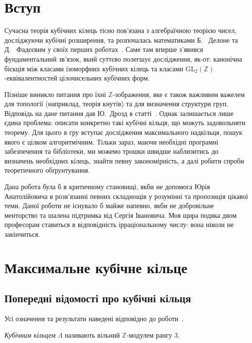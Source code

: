 \documentclass{thesis}
\begin{document}
\newpage

\chapter*{Вступ}\label{Introduction}
Сучасна теорія кубічних кілець тісно пов'язана з алгебраїчною теорією чисел, досліджуючи кубічні розширення, та розпочалась математиками Б.~ Делоне та Д.~ Фадєєвим у своїх перших роботах~\cite{delone1964theory}. Саме там вперше з'явився фундаментальний зв'язок, який суттєво полегшує дослідження, як-от: канонічна бієкція між класами ізоморфних кубічних кілець та класами $\mathrm{GL}_2(\mathbb{Z})$-еквівалентностей цілочисельних кубічних форм.

Пізніше виникло питання про їхні $\mathbb{Z}$-зображення, яке є також важливим важелем для топології (наприклад, теорія кнутів) та для визначення структури груп. Відповідь на дане питання дав Ю.~Дрозд в статті~\cite{drozd1967representations}. Однак залишається лише єдина проблема: описати конкретно такі кубічні кільця, що можуть задовольняти теорему. Для цього в гру вступає дослідження максимального надкільця, пошук якого є цілком алгоритмічним. Тільки зараз, маючи необхідні програмні забезпечення та бібліотеки, ми можемо трошки швидше наблизитись до визначень необхідних кілець, знайти певну закономірність, а далі робити спроби теоретичного обґрунтування.

Дана робота була б в критичному становищі, якби не допомога Юрія Анатолійовича в розв'язанні певних складнощів у розумінні та пропозиція цікавої теми. Даної роботи не існувало б майже напевно, якби не добровільне менторство та шалена підтримка від Сергія Івановича. Моя щира подяка двом професорам ставиться в відповідність ірраціональному числу: вона ніколи не закінчиться.
\newpage




\newpage

\chapter{Максимальне кубічне кільце}\label{chaper1}

\section{Попередні відомості про кубічні кільця}\label{section1.1}
Усі означення та результати наведені відповідно до роботи~\cite{faddeev1965theory}.
\begin{definition}
\textit{Кубічним кільцем} $\Lambda$ називають вільний $\mathbb{Z}$-модулем рангу $3$.
\end{definition}
\end{document}
